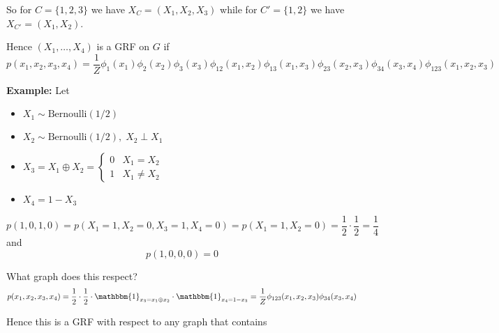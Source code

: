 \documentclass[12pt]{report}
\newcommand{\ind}{\mathbbm{1}}
\newcommand*{\tbf}[1]{\ifmmode\mathbf{#1}\else\textbf{#1}\fi}
\begin{document}
So for $C = \{1, 2, 3\}$ we have $X_C = (X_1, X_2, X_3)$ while for $C' = \{1, 2\}$ we have $X_{C'} = (X_1, X_2)$.

Hence $(X_1, \dots, X_4)$ is a GRF on $G$ if
\[p(x_1, x_2, x_3, x_4) = \frac{1}{Z} \phi_1(x_1) \phi_2(x_2) \phi_3(x_3) \phi_{12}(x_1, x_2) \phi_{13}(x_1, x_3) \phi_{23}(x_2, x_3) \phi_{34}(x_3, x_4) \phi_{123}(x_1, x_2, x_3)\]

\tbf{Example:} Let
\begin{itemize}
    \item $X_1 \sim \text{Bernoulli}(1/2)$
    \item $X_2 \sim \text{Bernoulli}(1/2), \; X_2 \perp X_1$
    \item $X_3 = X_1 \oplus X_2 = \begin{cases}
                  0 & X_1 = X_2    \\
                  1 & X_1 \neq X_2
              \end{cases}$
    \item $X_4 = 1 - X_3$
\end{itemize}

\[p(1, 0, 1, 0) = p(X_1 =1, X_2 = 0, X_3 = 1, X_4 = 0) = p(X_1= 1, X_2 = 0) = \frac{1}{2} \cdot \frac{1}{2} = \frac{1}{4}\]
and
\[p(1, 0, 0, 0) = 0\]

What graph does this respect?
\[p(x_1, x_2, x_3, x_4) = \frac{1}{2} \cdot \frac{1}{2} \cdot \ind_{x_3 = x_1 \oplus x_2} \cdot \ind_{x_4 = 1 - x_3} = \frac{1}{Z} \phi_{123}(x_1, x_2, x_3) \phi_{34}(x_3, x_4)\]

Hence this is a GRF with respect to any graph that contains
\begin{center}
\end{center}
\end{document}
